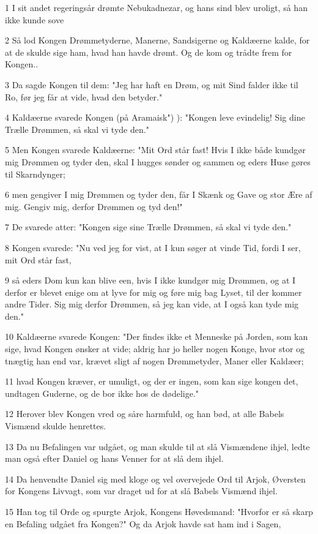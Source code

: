 \par 1 I sit andet regeringsår drømte Nebukadnezar, og hans sind blev uroligt, så han ikke kunde sove
\par 2 Så lod Kongen Drømmetyderne, Manerne, Sandsigerne og Kaldæerne kalde, for at de skulde sige ham, hvad han havde drømt. Og de kom og trådte frem for Kongen..
\par 3 Da sagde Kongen til dem: "Jeg har haft en Drøm, og mit Sind falder ikke til Ro, før jeg får at vide, hvad den betyder."
\par 4 Kaldæerne svarede Kongen (på Aramaisk") ): "Kongen leve evindelig! Sig dine Trælle Drømmen, så skal vi tyde den."
\par 5 Men Kongen svarede Kaldæerne: "Mit Ord står fast! Hvis I ikke både kundgør mig Drømmen og tyder den, skal I hugges sønder og sammen og eders Huse gøres til Skarndynger;
\par 6 men gengiver I mig Drømmen og tyder den, får I Skænk og Gave og stor Ære af mig. Gengiv mig, derfor Drømmen og tyd den!"
\par 7 De svarede atter: "Kongen sige sine Trælle Drømmen, så skal vi tyde den."
\par 8 Kongen svarede: "Nu ved jeg for vist, at I kun søger at vinde Tid, fordi I ser, mit Ord står fast,
\par 9 så eders Dom kun kan blive een, hvis I ikke kundgør mig Drømmen, og at I derfor er blevet enige om at lyve for mig og føre mig bag Lyset, til der kommer andre Tider. Sig mig derfor Drømmen, så jeg kan vide, at I også kan tyde mig den."
\par 10 Kaldæerne svarede Kongen: "Der findes ikke et Menneske på Jorden, som kan sige, hvad Kongen ønsker at vide; aldrig har jo heller nogen Konge, hvor stor og tnægtig han end var, krævet sligt af nogen Drømmetyder, Maner eller Kaldæer;
\par 11 hvad Kongen kræver, er umuligt, og der er ingen, som kan sige kongen det, undtagen Guderne, og de bor ikke hos de dødelige."
\par 12 Herover blev Kongen vred og såre harmfuld, og han bød, at alle Babels Vismænd skulde henrettes.
\par 13 Da nu Befalingen var udgået, og man skulde til at slå Vismændene ihjel, ledte man også efter Daniel og hans Venner for at slå dem ihjel.
\par 14 Da henvendte Daniel sig med kloge og vel overvejede Ord til Arjok, Øversten for Kongens Livvagt, som var draget ud for at slå Babels Vismænd ihjel.
\par 15 Han tog til Orde og spurgte Arjok, Kongens Høvedsmand: "Hvorfor er så skarp en Befaling udgået fra Kongen?" Og da Arjok havde sat ham ind i Sagen,
